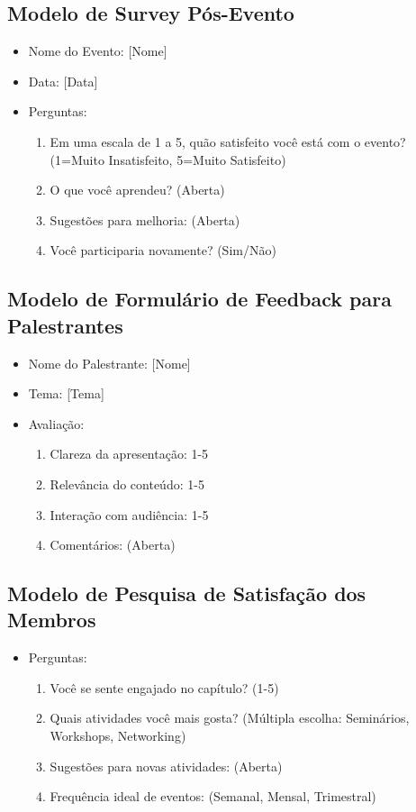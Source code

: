 \documentclass[12pt]{article}
\begin{document}
\subsection{Modelo de Survey Pós-Evento}
\begin{itemize}
    \item Nome do Evento: [Nome]
    \item Data: [Data]
    \item Perguntas:
      \begin{enumerate}
        \item Em uma escala de 1 a 5, quão satisfeito você está com o evento? (1=Muito Insatisfeito, 5=Muito Satisfeito)
        \item O que você aprendeu? (Aberta)
        \item Sugestões para melhoria: (Aberta)
        \item Você participaria novamente? (Sim/Não)
      \end{enumerate}
\end{itemize}

\subsection{Modelo de Formulário de Feedback para Palestrantes}
\begin{itemize}
    \item Nome do Palestrante: [Nome]
    \item Tema: [Tema]
    \item Avaliação:
      \begin{enumerate}
        \item Clareza da apresentação: 1-5
        \item Relevância do conteúdo: 1-5
        \item Interação com audiência: 1-5
        \item Comentários: (Aberta)
      \end{enumerate}
\end{itemize}

\subsection{Modelo de Pesquisa de Satisfação dos Membros}
\begin{itemize}
    \item Perguntas:
      \begin{enumerate}
        \item Você se sente engajado no capítulo? (1-5)
        \item Quais atividades você mais gosta? (Múltipla escolha: Seminários, Workshops, Networking)
        \item Sugestões para novas atividades: (Aberta)
        \item Frequência ideal de eventos: (Semanal, Mensal, Trimestral)
      \end{enumerate}
\end{itemize}
\end{document}
